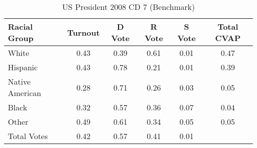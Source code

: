 \begin{table}[htb]
\begin{center}
\caption{US President 2008 CD 7 (Benchmark)}
\label{pres08_cvap_cd_7_benchmark}
\begin{tabular}{lccccc}
  \hline
Racial Group & Turnout & D Vote & R Vote & S Vote & Total CVAP \\ 
  \hline
White & 0.43 & 0.39 & 0.61 & 0.01 & 0.47 \\ 
  Hispanic & 0.43 & 0.78 & 0.21 & 0.01 & 0.39 \\ 
  Native American & 0.28 & 0.71 & 0.26 & 0.03 & 0.05 \\ 
  Black & 0.32 & 0.57 & 0.36 & 0.07 & 0.04 \\ 
  Other & 0.49 & 0.61 & 0.34 & 0.05 & 0.05 \\ 
  Total Votes & 0.42 & 0.57 & 0.41 & 0.01 &  \\ 
   \hline
\end{tabular}
\end{center}
\end{table}
